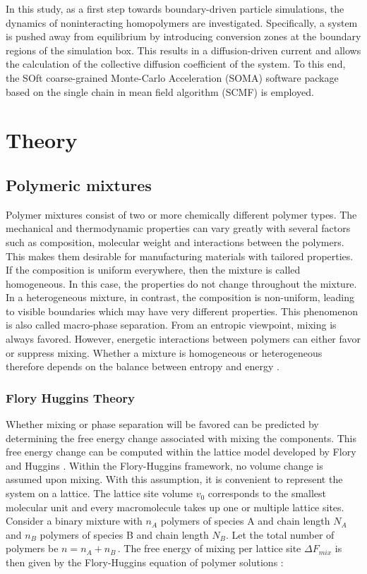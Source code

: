 \documentclass[bachelor,       %
               twoside,        %
               BCOR10mm,       %
                ngerman,english  %
               ]{GAUBM}
\begin{document}
In this study, as a first step towards boundary-driven particle simulations, the dynamics of noninteracting homopolymers are investigated. Specifically, a system is pushed away from equilibrium by introducing conversion zones at the boundary regions of the simulation box. This results in a diffusion-driven current and allows the calculation of the collective diffusion coefficient of the system. To this end, the SOft coarse-grained Monte-Carlo Acceleration (SOMA) \cite{Schneider_soma} software package based on the single chain in mean field algorithm (SCMF) \cite{Daoulas06} is employed.



\chapter{Theory}

\section{Polymeric mixtures}
Polymer mixtures consist of two or more chemically different polymer types. The mechanical and thermodynamic properties can vary greatly with several factors such as composition, molecular weight and interactions between the polymers. This makes them desirable for manufacturing materials with tailored properties.\\
If the composition is uniform everywhere, then the mixture is called homogeneous. In this case, the properties do not change throughout the mixture. In a heterogeneous mixture, in contrast, the composition is non-uniform, leading to visible boundaries which may have very different properties. This phenomenon is also called macro-phase separation. From an entropic viewpoint, mixing is always favored. However, energetic interactions between polymers can either favor or suppress mixing. Whether a mixture is homogeneous or heterogeneous therefore depends on the balance between entropy and energy \cite[S. 137]{Rubin03}.           

\subsection{Flory Huggins Theory}

Whether mixing or phase separation will be favored can be predicted by determining the free energy change associated with mixing the components. This free energy change can be computed within the lattice model developed by Flory and Huggins \cite{Flory42}. Within the Flory-Huggins framework, no volume change is assumed upon mixing. With this assumption, it is convenient to represent the system on a lattice. The lattice site volume $v_0$ corresponds to the smallest molecular unit and every macromolecule takes up one or multiple lattice sites. Consider a binary mixture with $n_A$ polymers of species A and chain length $N_A$ and $n_B$ polymers of species B and chain length $N_B$. Let the total number of polymers be $n=n_A+n_B\,.$ The free energy of mixing per lattice site $\Delta F_{mix}$ is then given by the Flory-Huggins equation of polymer solutions \cite[S. 143]{Rubin03}:
\end{document}
